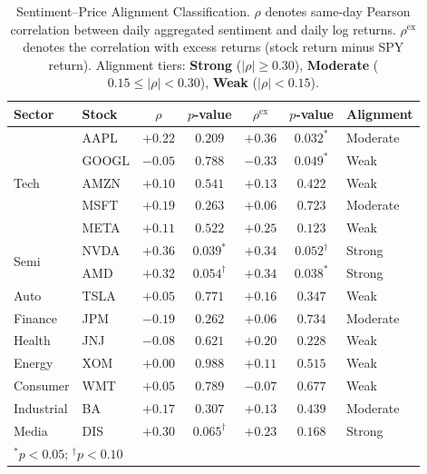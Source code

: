 \documentclass[lettersize,journal]{IEEEtran}
\begin{document}
\begin{table}[t!]
\centering
\caption{Sentiment--Price Alignment Classification. $\rho$ denotes same-day Pearson correlation between daily aggregated sentiment and daily log returns. $\rho^{\mathrm{ex}}$ denotes the correlation with excess returns (stock return minus SPY return). Alignment tiers: \textbf{Strong} ($|\rho| \geq 0.30$), \textbf{Moderate} ($0.15 \leq |\rho| < 0.30$), \textbf{Weak} ($|\rho| < 0.15$).}
\label{tab:alignment}
\begin{tabular}{llccccl}
\toprule
\textbf{Sector} & \textbf{Stock} & \textbf{$\rho$} & \textbf{$p$-value} & \textbf{$\rho^{\mathrm{ex}}$} & \textbf{$p$-value} & \textbf{Alignment} \\
\midrule
\multirow{5}{*}{Tech}  & AAPL  & $+0.22$ & $0.209$ & $+0.36$ & $0.032^{*}$ & Moderate \\
                        & GOOGL & $-0.05$ & $0.788$ & $-0.33$ & $0.049^{*}$ & Weak \\
                        & AMZN  & $+0.10$ & $0.541$ & $+0.13$ & $0.422$ & Weak \\
                        & MSFT  & $+0.19$ & $0.263$ & $+0.06$ & $0.723$ & Moderate \\
                        & META  & $+0.11$ & $0.522$ & $+0.25$ & $0.123$ & Weak \\
\midrule
\multirow{2}{*}{Semi}  & NVDA  & $+0.36$ & $0.039^{*}$ & $+0.34$ & $0.052^{\dagger}$ & Strong \\
                        & AMD   & $+0.32$ & $0.054^{\dagger}$ & $+0.34$ & $0.038^{*}$ & Strong \\
\midrule
Auto   & TSLA  & $+0.05$ & $0.771$ & $+0.16$ & $0.347$ & Weak \\
\midrule
Finance & JPM  & $-0.19$ & $0.262$ & $+0.06$ & $0.734$ & Moderate \\
\midrule
Health & JNJ   & $-0.08$ & $0.621$ & $+0.20$ & $0.228$ & Weak \\
\midrule
Energy & XOM   & $+0.00$ & $0.988$ & $+0.11$ & $0.515$ & Weak \\
\midrule
Consumer & WMT & $+0.05$ & $0.789$ & $-0.07$ & $0.677$ & Weak \\
\midrule
Industrial & BA & $+0.17$ & $0.307$ & $+0.13$ & $0.439$ & Moderate \\
\midrule
Media  & DIS   & $+0.30$ & $0.065^{\dagger}$ & $+0.23$ & $0.168$ & Strong \\
\bottomrule
\multicolumn{7}{l}{\small $^{*}p < 0.05$; $^{\dagger}p < 0.10$}
\end{tabular}
\end{table}
\end{document}
